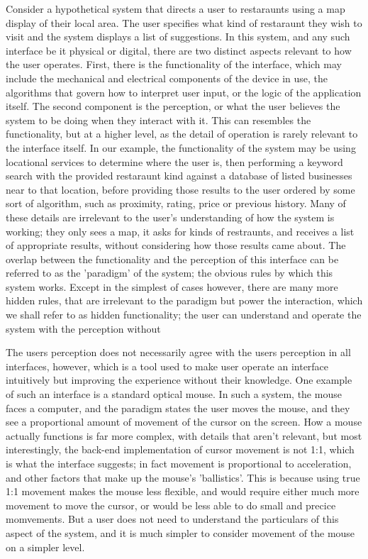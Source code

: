 Consider a hypothetical system that directs a user to restaraunts using a map display of their local area. The user specifies what kind of restaraunt they wish to visit and the system displays a list of suggestions. In this system, and any such interface be it physical or digital, there are two distinct aspects relevant to how the user operates. First, there is the functionality of the interface, which may include the mechanical and electrical components of the device in use, the algorithms that govern how to interpret user input, or the logic of the application itself. The second component is the perception, or what the user believes the system to be doing when they interact with it. This can resembles the functionality, but at a higher level, as the detail of operation is rarely relevant to the interface itself. In our example, the functionality of the system may be using locational services to determine where the user is, then performing a keyword search with the provided restaraunt kind against a database of listed businesses near to that location, before providing those results to the user ordered by some sort of algorithm, such as proximity, rating, price or previous history. Many of these details are irrelevant to the user's understanding of how the system is working; they only sees a map, it asks for kinds of restraunts, and receives a list of appropriate results, without considering how those results came about. The overlap between the functionality and the perception of this interface can be referred to as the 'paradigm' of the system; the obvious rules by which this system works. Except in the simplest of cases however, there are many more hidden rules, that are irrelevant to the paradigm but power the interaction, which we shall refer to as hidden functionality; the user can understand and operate the system with the perception without 

The users perception does not necessarily agree with the users perception in all interfaces, however, which is a tool used to make user operate an interface intuitively but improving the experience without their knowledge. One example of such an interface is a standard optical mouse. In such a system, the mouse faces a computer, and the paradigm states the user moves the mouse, and they see a proportional amount of movement of the cursor on the screen. How a mouse actually functions is far more complex, with details that aren't relevant, but most interestingly, the back-end implementation of cursor movement is not 1:1, which is what the interface suggests; in fact movement is proportional to acceleration, and other factors that make up the mouse's 'ballistics'. This is because using true 1:1 movement makes the mouse less flexible, and would require either much more movement to move the cursor, or would be less able to do small and precice momvements. But a user does not need to understand the particulars of this aspect of the system, and it is much simpler to consider movement of the mouse on a simpler level. 

